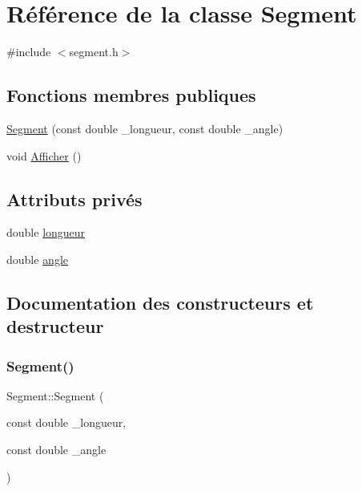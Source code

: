 \hypertarget{class_segment}{}\section{Référence de la classe Segment}
\label{class_segment}


{\ttfamily \#include $<$segment.\+h$>$}

\subsection*{Fonctions membres publiques}
\begin{DoxyCompactItemize}
\item 
\hyperlink{class_segment_ad3b498d0e23a006fc3e750bd76153a2a}{Segment} (const double \+\_\+longueur, const double \+\_\+angle)
\item 
void \hyperlink{class_segment_a1ec3ffd47a383755b4f0a51311a5c7d7}{Afficher} ()
\end{DoxyCompactItemize}
\subsection*{Attributs privés}
\begin{DoxyCompactItemize}
\item 
double \hyperlink{class_segment_a89584eea5e0b7c9d3fe5bcddf437f358}{longueur}
\item 
double \hyperlink{class_segment_a58f4b5a7f3c0a1038d10e778f3684b20}{angle}
\end{DoxyCompactItemize}


\subsection{Documentation des constructeurs et destructeur}
\mbox{\label{class_segment_ad3b498d0e23a006fc3e750bd76153a2a}} 
\subsubsection{\texorpdfstring{Segment()}{Segment()}}
{\footnotesize\ttfamily Segment\+::\+Segment (\begin{DoxyParamCaption}\item[{const double}]{\+\_\+longueur,  }\item[{const double}]{\+\_\+angle }\end{DoxyParamCaption})}



